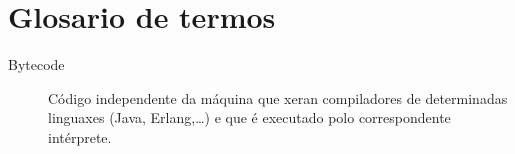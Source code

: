 \chapter*{Glosario de termos}
\label{chap:glosario-termos}


\begin{description}
 \item [Bytecode] Código independente da máquina que xeran
   compiladores de determinadas linguaxes (Java, Erlang,\dots) e que
   é executado polo correspondente intérprete.
\end{description}
